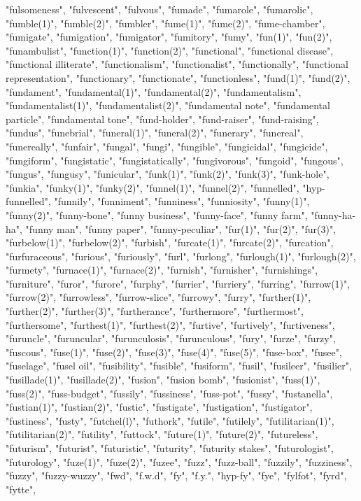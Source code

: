 "fulsomeness",
"fulvescent",
"fulvous",
"fumade",
"fumarole",
"fumarolic",
"fumble(1)",
"fumble(2)",
"fumbler",
"fume(1)",
"fume(2)",
"fume-chamber",
"fumigate",
"fumigation",
"fumigator",
"fumitory",
"fumy",
"fun(1)",
"fun(2)",
"funambulist",
"function(1)",
"function(2)",
"functional",
"functional disease",
"functional illiterate",
"functionalism",
"functionalist",
"functionally",
"functional representation",
"functionary",
"functionate",
"functionless",
"fund(1)",
"fund(2)",
"fundament",
"fundamental(1)",
"fundamental(2)",
"fundamentalism",
"fundamentalist(1)",
"fundamentalist(2)",
"fundamental note",
"fundamental particle",
"fundamental tone",
"fund-holder",
"fund-raiser",
"fund-raising",
"fundus",
"funebrial",
"funeral(1)",
"funeral(2)",
"funerary",
"funereal",
"funereally",
"funfair",
"fungal",
"fungi",
"fungible",
"fungicidal",
"fungicide",
"fungiform",
"fungistatic",
"fungistatically",
"fungivorous",
"fungoid",
"fungous",
"fungus",
"fungusy",
"funicular",
"funk(1)",
"funk(2)",
"funk(3)",
"funk-hole",
"funkia",
"funky(1)",
"funky(2)",
"funnel(1)",
"funnel(2)",
"funnelled",
"hyp-funnelled",
"funnily",
"funniment",
"funniness",
"funniosity",
"funny(1)",
"funny(2)",
"funny-bone",
"funny business",
"funny-face",
"funny farm",
"funny-ha-ha",
"funny man",
"funny paper",
"funny-peculiar",
"fur(1)",
"fur(2)",
"fur(3)",
"furbelow(1)",
"furbelow(2)",
"furbish",
"furcate(1)",
"furcate(2)",
"furcation",
"furfuraceous",
"furious",
"furiously",
"furl",
"furlong",
"furlough(1)",
"furlough(2)",
"furmety",
"furnace(1)",
"furnace(2)",
"furnish",
"furnisher",
"furnishings",
"furniture",
"furor",
"furore",
"furphy",
"furrier",
"furriery",
"furring",
"furrow(1)",
"furrow(2)",
"furrowless",
"furrow-slice",
"furrowy",
"furry",
"further(1)",
"further(2)",
"further(3)",
"furtherance",
"furthermore",
"furthermost",
"furthersome",
"furthest(1)",
"furthest(2)",
"furtive",
"furtively",
"furtiveness",
"furuncle",
"furuncular",
"furunculosis",
"furunculous",
"fury",
"furze",
"furzy",
"fuscous",
"fuse(1)",
"fuse(2)",
"fuse(3)",
"fuse(4)",
"fuse(5)",
"fuse-box",
"fusee",
"fuselage",
"fusel oil",
"fusibility",
"fusible",
"fusiform",
"fusil",
"fusileer",
"fusilier",
"fusillade(1)",
"fusillade(2)",
"fusion",
"fusion bomb",
"fusionist",
"fuss(1)",
"fuss(2)",
"fuss-budget",
"fussily",
"fussiness",
"fuss-pot",
"fussy",
"fustanella",
"fustian(1)",
"fustian(2)",
"fustic",
"fustigate",
"fustigation",
"fustigator",
"fustiness",
"fusty",
"futchel(l)",
"futhork",
"futile",
"futilely",
"futilitarian(1)",
"futilitarian(2)",
"futility",
"futtock",
"future(1)",
"future(2)",
"futureless",
"futurism",
"futurist",
"futuristic",
"futurity",
"futurity stakes",
"futurologist",
"futurology",
"fuze(1)",
"fuze(2)",
"fuzee",
"fuzz",
"fuzz-ball",
"fuzzily",
"fuzziness",
"fuzzy",
"fuzzy-wuzzy",
"fwd",
"f.w.d",
"fy",
"f.y.",
"hyp-fy",
"fye",
"fylfot",
"fyrd",
"fytte",

